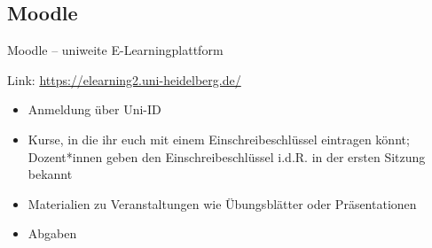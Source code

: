 
\subsection{Moodle}
\begin{frame}{Moodle -- uniweite E-Learningplattform}

    Link: \url{https://elearning2.uni-heidelberg.de/}

    \begin{itemize}
        \item Anmeldung über Uni-ID
        \item{Kurse, in die ihr euch mit einem Einschreibeschlüssel eintragen könnt; Dozent*innen geben den Einschreibeschlüssel i.d.R. in der ersten Sitzung bekannt}
        \item{Materialien zu Veranstaltungen wie Übungsblätter oder Präsentationen}
        \item{Abgaben}
    \end{itemize}

\end{frame}

